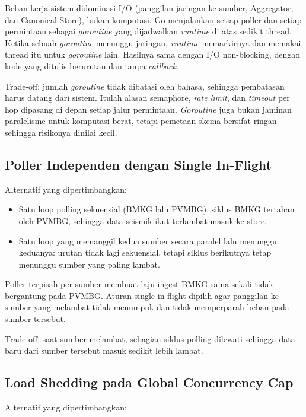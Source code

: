 Beban kerja sistem didominasi I/O (panggilan jaringan ke sumber, Aggregator, dan Canonical Store), bukan komputasi. Go menjalankan setiap poller dan setiap permintaan sebagai \emph{goroutine} yang dijadwalkan \emph{runtime} di atas sedikit thread. Ketika sebuah \emph{goroutine} menunggu jaringan, \emph{runtime} memarkirnya dan memakai thread itu untuk \emph{goroutine} lain. Hasilnya sama dengan I/O non-blocking, dengan kode yang ditulis berurutan dan tanpa \emph{callback}.

Trade-off: jumlah \emph{goroutine} tidak dibatasi oleh bahasa, sehingga pembatasan harus datang dari sistem. Itulah alasan semaphore, \emph{rate limit}, dan \emph{timeout} per hop dipasang di depan setiap jalur permintaan. \emph{Goroutine} juga bukan jaminan paralelisme untuk komputasi berat, tetapi pemetaan skema bersifat ringan sehingga risikonya dinilai kecil.

\subsection{Poller Independen dengan Single In-Flight}

Alternatif yang dipertimbangkan:

\begin{itemize}
\tightlist
\item
  Satu loop polling sekuensial (BMKG lalu PVMBG): siklus BMKG tertahan oleh PVMBG, sehingga data seismik ikut terlambat masuk ke store.\\
\item
  Satu loop yang memanggil kedua sumber secara paralel lalu menunggu keduanya: urutan tidak lagi sekuensial, tetapi siklus berikutnya tetap menunggu sumber yang paling lambat.
\end{itemize}

Poller terpisah per sumber membuat laju ingest BMKG sama sekali tidak bergantung pada PVMBG. Aturan single in-flight dipilih agar panggilan ke sumber yang melambat tidak menumpuk dan tidak memperparah beban pada sumber tersebut.

Trade-off: saat sumber melambat, sebagian siklus polling dilewati sehingga data baru dari sumber tersebut masuk sedikit lebih lambat.

\subsection{Load Shedding pada Global Concurrency Cap}

Alternatif yang dipertimbangkan:

